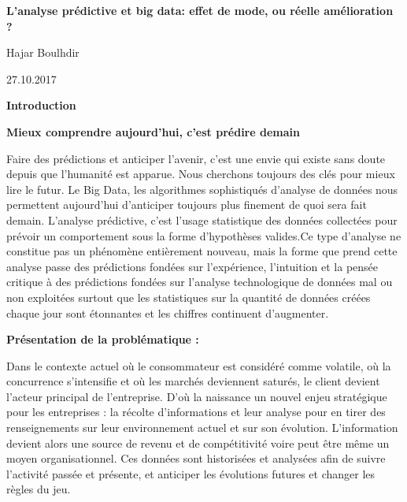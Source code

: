 \documentclass{article}
\begin{document}
\begin{center}
{\Large \textbf{L’analyse prédictive et big data: effet de mode, ou réelle amélioration ?}}
\vspace{0.5cm}

Hajar Boulhdir

27.10.2017
\end{center}
\vspace{0.5cm}

\begin{center}
\textbf{Introduction}
\end{center}

\vspace{0.5cm}
\textbf{Mieux comprendre aujourd’hui, c’est prédire demain}
\vspace{0.5cm}

Faire des prédictions et anticiper l’avenir, c’est une envie qui existe sans doute depuis que l’humanité est apparue. Nous cherchons toujours des clés pour mieux lire le futur. Le Big Data, les algorithmes sophistiqués d’analyse de données nous permettent aujourd’hui d’anticiper toujours plus finement de quoi sera fait demain. 
L’analyse prédictive, c’est l’usage statistique des données collectées pour prévoir un comportement sous la forme d’hypothèses valides.Ce type d’analyse ne constitue pas un phénomène entièrement nouveau, mais la forme que prend cette analyse passe des prédictions fondées sur l’expérience, l’intuition et la pensée critique à des prédictions fondées sur l’analyse technologique de données mal ou non exploitées surtout que les statistiques sur la quantité de données créées chaque jour sont étonnantes et les chiffres continuent d’augmenter.
\vspace{0.5cm}

\textbf{Présentation de la problématique :}

\vspace{0.5cm}
Dans le contexte actuel où le consommateur est considéré comme volatile, où la concurrence s’intensifie et où les marchés deviennent saturés, le client devient l’acteur principal de l’entreprise. D’où la naissance un nouvel enjeu stratégique pour les entreprises : la récolte d’informations et leur analyse pour en tirer des renseignements sur leur environnement actuel et sur son évolution. L’information devient alors une source de revenu et de compétitivité voire peut être même un moyen organisationnel. Ces données sont historisées et analysées afin de suivre l’activité passée et présente, et anticiper les évolutions futures et changer les règles du jeu.
\end{document}

